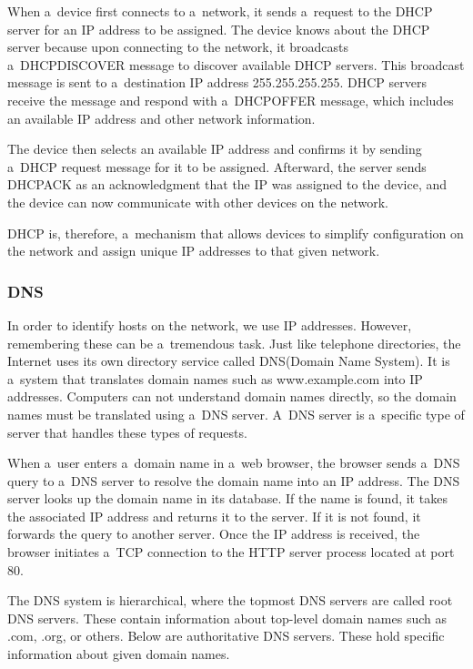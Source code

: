 \documentclass[
  printed,     %
  color,       %
  oneside,     %
  nosansbold,  %
  nocolorbold, %
  nolof,         %
  nolot,         %
]{fithesis4}
\begin{document}
When a~device first connects to a~network, it sends a~request to the DHCP server for an IP address to be assigned. The device knows about the DHCP server because upon connecting to the network, it broadcasts a~DHCPDISCOVER message to discover available DHCP servers. This broadcast message is sent to a~destination IP address 255.255.255.255. DHCP servers receive the message and respond with a~DHCPOFFER message, which includes an available IP address and other network information.

The device then selects an available IP address and confirms it by sending a~DHCP request message for it to be assigned. Afterward, the server sends DHCPACK as an acknowledgment that the IP was assigned to the device, and the device can now communicate with other devices on the network.

DHCP is, therefore, a~mechanism that allows devices to simplify configuration on the network and assign unique IP addresses to that given network.

\subsubsection{DNS}
\label{sec:dns}
In order to identify hosts on the network, we use IP addresses. However, remembering these can be a~tremendous task. Just like telephone directories, the Internet uses its own directory service called DNS(Domain Name System). It is a~system that translates domain names such as www.example.com into IP addresses. Computers can not understand domain names directly, so the domain names must be translated using a~DNS server. A~DNS server is a~specific type of server that handles these types of requests.

When a~user enters a~domain name in a~web browser, the browser sends a~DNS query to a~DNS server to resolve the domain name into an IP address. The DNS server looks up the domain name in its database. If the name is found, it takes the associated IP address and returns it to the server. If it is not found, it forwards the query to another server. Once the IP address is received, the browser initiates a~TCP connection to the HTTP server process located at port 80.

The DNS system is hierarchical, where the topmost DNS servers are called root DNS servers. These contain information about top-level domain names such as .com, .org, or others. Below are authoritative DNS servers. These hold specific information about given domain names.
\end{document}
